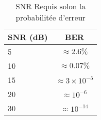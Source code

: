 \begin{table}
    \caption{SNR Requis solon la probabilitée d'erreur}
    \begin{tabular}{l | c}
        \toprule
        SNR (dB) & BER \\
        \midrule
        \hline
        5  & $\approx 2.6\%$\\
        10  & $\approx 0.07\%$\\
        15  & $\approx 3\times10^{-5}$\\
        20  & $\approx 10^{-6}$\\
        30  & $\approx 10^{-14}$\\
        \bottomrule
    \end{tabular}
\end{table}